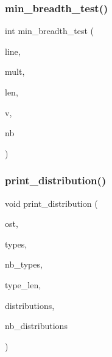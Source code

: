\mbox{\label{tdo__refine__all_8_c_aaea0b3ff8d16bdd0b235d2823f6bfcb1}} 
\subsubsection{\texorpdfstring{min\+\_\+breadth\+\_\+test()}{min\_breadth\_test()}}
{\footnotesize\ttfamily int min\+\_\+breadth\+\_\+test (\begin{DoxyParamCaption}\item[{int $\ast$}]{line,  }\item[{int $\ast$}]{mult,  }\item[{int}]{len,  }\item[{int}]{v,  }\item[{int}]{nb }\end{DoxyParamCaption})}

\mbox{\label{tdo__refine__all_8_c_a3d4fe27380b7b1e19b559b17f0de36c1}} 
\subsubsection{\texorpdfstring{print\+\_\+distribution()}{print\_distribution()}}
{\footnotesize\ttfamily void print\+\_\+distribution (\begin{DoxyParamCaption}\item[{ostream \&}]{ost,  }\item[{\mbox{\hyperlink{galois_8h_a09fddde158a3a20bd2dcadb609de11dc}{I\+NT}} $\ast$}]{types,  }\item[{\mbox{\hyperlink{galois_8h_a09fddde158a3a20bd2dcadb609de11dc}{I\+NT}}}]{nb\+\_\+types,  }\item[{\mbox{\hyperlink{galois_8h_a09fddde158a3a20bd2dcadb609de11dc}{I\+NT}}}]{type\+\_\+len,  }\item[{\mbox{\hyperlink{galois_8h_a09fddde158a3a20bd2dcadb609de11dc}{I\+NT}} $\ast$}]{distributions,  }\item[{\mbox{\hyperlink{galois_8h_a09fddde158a3a20bd2dcadb609de11dc}{I\+NT}}}]{nb\+\_\+distributions }\end{DoxyParamCaption})}

